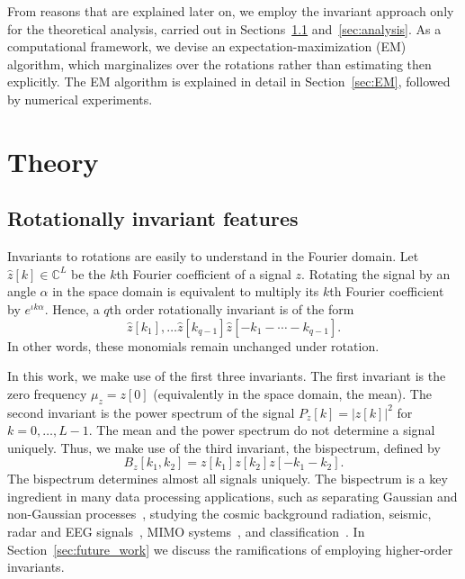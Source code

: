 \documentclass[english,12pt]{article}
\newcommand{\I}{\iota}
\newcommand{\C}{\mathbb{C}}
\numberwithin{equation}{section}
\numberwithin{thm}{section} %
\begin{document}
From reasons that are explained later on, we employ the invariant approach only for the theoretical analysis, carried out in Sections~\ref{sec:invariants} and~\ref{sec:analysis}. As a computational framework, we devise an expectation-maximization (EM) algorithm, which marginalizes over the rotations rather than estimating then explicitly.  The EM algorithm is explained in detail in Section~\ref{sec:EM}, followed by numerical experiments.  

\section{Theory} 

\subsection{Rotationally invariant features} \label{sec:invariants}

Invariants to rotations are easily to understand in the Fourier domain.
Let $\hat{z}[k]\in \C^L$ be the $k$th Fourier coefficient of a signal $z$. Rotating the signal by an angle $\alpha$ in the space domain is equivalent to multiply its $k$th Fourier coefficient by $e^{\I k\alpha}$. Hence, a $q$th order rotationally invariant is of the form
\begin{equation}
\hat{z}[k_1],\ldots \hat{z}[k_{q-1}]{\hat{z}[-k_1-\cdots-k_{q-1}]}.
\end{equation} 
In other words, these monomials remain unchanged under rotation. 

In this work, we make use of the first three invariants. The first invariant is the zero frequency $\mu_z = z[0]$ (equivalently in the space domain, the mean). The second invariant is the power spectrum of the signal $P_z[k]=|z[k]|^2$ for $k=0,\ldots,L-1$. The mean and the power spectrum do not determine a signal uniquely. 
Thus, we make use of the third invariant, the bispectrum, defined by~\cite{tukey1953spectral}
\begin{equation}
B_z[k_1,k_2] = z[k_1]z[k_2]z[-k_1-k_2].
\end{equation}
The bispectrum determines almost all signals uniquely. 
The bispectrum is a key ingredient in many data processing applications, such as separating Gaussian and non-Gaussian processes~\cite{brockett1988bispectral}, studying the cosmic background
radiation, seismic, radar and EEG signals~\cite{wang2000cosmic,chen2008feature,ning1989bispectral}, MIMO systems~\cite{chen2001frequency}, and classification~\cite{zhao2014rotationally}.  
In Section~\ref{sec:future_work} we discuss the ramifications of employing higher-order invariants.  
\end{document}
